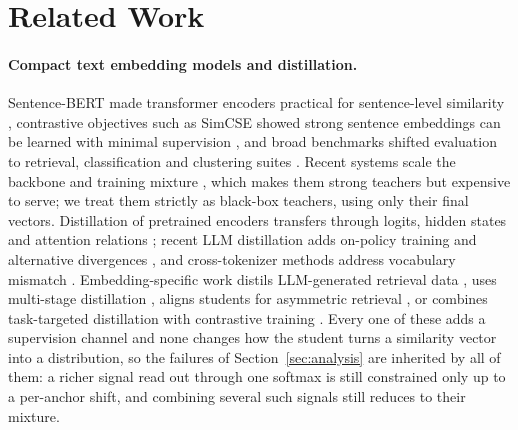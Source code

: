 \section{Related Work}
\label{sec:related}

\paragraph{Compact text embedding models and distillation.}
Sentence-BERT made transformer encoders practical for sentence-level similarity
\citep{reimers2019sentencebert}, contrastive objectives such as SimCSE showed strong
sentence embeddings can be learned with minimal supervision \citep{gao2021simcse}, and
broad benchmarks shifted evaluation to retrieval, classification and clustering suites
\citep{thakur2021beir,muennighoff2023mteb,chung2025maintainingmteb}. Recent systems scale
the backbone and training mixture \citep{chen2024bgem3,zhang2025qwen3embedding,zhang2025dewey},
which makes them strong teachers but expensive to serve; we treat them strictly as
black-box teachers, using only their final vectors. Distillation of pretrained encoders
transfers through logits, hidden states and attention relations
\citep{hinton2015distilling,sanh2019distilbert,jiao2019tinybert,wang2020minilm}; recent LLM
distillation adds on-policy training and alternative divergences
\citep{agarwal2024onpolicy,ko2025distillm2,wen2023fdivergence,xu2024survey}, and
cross-tokenizer methods address vocabulary mismatch \citep{zhang2024dskd,chen2025cdm}.
Embedding-specific work distils LLM-generated retrieval data \citep{lee2024gecko}, uses
multi-stage distillation \citep{zhang2024jasperstella}, aligns students for asymmetric
retrieval \citep{vujanic2025leaf}, or combines task-targeted distillation with contrastive
training \citep{akram2026jinaembeddingsv5}. Every one of these adds a supervision channel and
none changes how the student turns a similarity vector into a distribution, so the failures
of Section~\ref{sec:analysis} are inherited by all of them: a richer signal read out through
one softmax is still constrained only up to a per-anchor shift, and combining several such
signals still reduces to their mixture.


